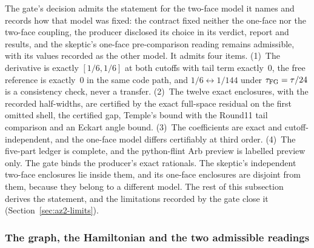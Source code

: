 The gate's decision admits the statement for the two-face model it names and
records how that model was fixed: the contract fixed neither the one-face nor
the two-face coupling, the producer disclosed its choice in its verdict,
report and results, and the skeptic's one-face pre-comparison reading remains
admissible, with its values recorded as the other model. It admits four
items. (1)~The derivative is exactly $[1/6,1/6]$ at both cutoffs with tail
term exactly~0, the free reference is exactly~0 in the same code path, and
$1/6\leftrightarrow1/144$ under $\tau_{\mathrm{FG}}=\tau/24$ is a consistency check, never a
transfer. (2)~The twelve exact enclosures, with the recorded half-widths, are
certified by the exact full-space residual on the first omitted shell, the
certified gap, Temple's bound with the Round11 tail comparison and an Eckart
angle bound. (3)~The coefficients are exact and cutoff-independent, and the
one-face model differs certifiably at third order. (4)~The five-part ledger
is complete, and the python-flint Arb preview is labelled preview only. The
gate binds the producer's exact rationals. The skeptic's independent two-face
enclosures lie inside them, and its one-face enclosures are disjoint from
them, because they belong to a different model. The rest of this subsection
derives the statement, and the limitations recorded by the gate close it
(Section~\ref{sec:az2-limits}).

\subsubsection{The graph, the Hamiltonian and the two admissible readings}
\label{sec:az2-model}
